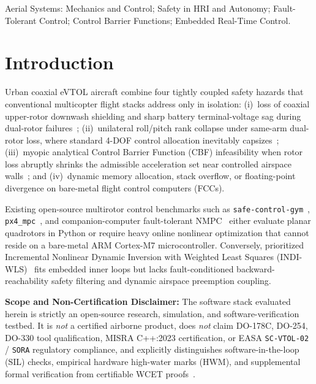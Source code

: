 \documentclass[letterpaper, 10 pt, journal, twoside]{IEEEtran}
\begin{document}
\begin{IEEEkeywords}
Aerial Systems: Mechanics and Control; Safety in HRI and Autonomy; Fault-Tolerant Control; Control Barrier Functions; Embedded Real-Time Control.
\end{IEEEkeywords}

\section{Introduction}
\label{sec:intro}

Urban coaxial eVTOL aircraft combine four tightly coupled safety hazards that conventional multicopter flight stacks address only in isolation: (i)~loss of coaxial upper-rotor downwash shielding and sharp battery terminal-voltage sag during dual-rotor failures~\cite{leishman_coaxial_2006}; (ii)~unilateral roll/pitch rank collapse under same-arm dual-rotor loss, where standard 4-DOF control allocation inevitably capsizes~\cite{mueller_relaxed_hover_2014}; (iii)~myopic analytical Control Barrier Function (CBF) infeasibility when rotor loss abruptly shrinks the admissible acceleration set near controlled airspace walls~\cite{ames_cbf_2019,choi_cbvf_2021}; and (iv)~dynamic memory allocation, stack overflow, or floating-point divergence on bare-metal flight control computers (FCCs).

Existing open-source multirotor control benchmarks such as \texttt{safe-control-gym}~\cite{yuan_safecontrolgym_2022}, \texttt{px4\_mpc}~\cite{lim_px4_mpc_2024}, and companion-computer fault-tolerant NMPC~\cite{nan_ftc_nmpc_indi_2022} either evaluate planar quadrotors in Python or require heavy online nonlinear optimization that cannot reside on a bare-metal ARM Cortex-M7 microcontroller. Conversely, prioritized Incremental Nonlinear Dynamic Inversion with Weighted Least Squares (INDI-WLS)~\cite{smeur_indi_wls_2017} fits embedded inner loops but lacks fault-conditioned backward-reachability safety filtering and dynamic airspace preemption coupling.

\textbf{Scope and Non-Certification Disclaimer:} The software stack evaluated herein is strictly an open-source research, simulation, and software-verification testbed. It is \emph{not} a certified airborne product, does \emph{not} claim DO-178C, DO-254, DO-330 tool qualification, MISRA C++:2023 certification, or EASA \texttt{SC-VTOL-02} / \texttt{SORA} regulatory compliance, and explicitly distinguishes software-in-the-loop (SIL) checks, empirical hardware high-water marks (HWM), and supplemental formal verification from certifiable WCET proofs~\cite{easa_scvtol_2024}.
\end{document}
